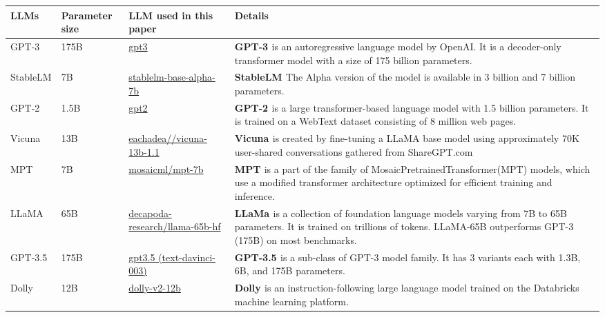 \begin{table}[!htp]\centering
\scriptsize
\begin{tabular}{p{1cm}|p{1.1cm}|p{3cm}|p{8.9cm}}\toprule
\textbf{LLMs} &\textbf{Parameter size} &\textbf{LLM used in this paper}  &\textbf{Details}\\\midrule
GPT-3 &175B & \href{https://platform.openai.com/docs/models/gpt-3}{gpt3} &  \textbf{GPT-3 \cite{brown2020language}} is an autoregressive language model by OpenAI. It is a decoder-only transformer model with a size of 175 billion parameters. \\ \midrule
StableLM &7B &\href{https://huggingface.co/stabilityai/stablelm-base-alpha-7b}{stablelm-base-alpha-7b} & \textbf{StableLM \cite{liu2023your}} The Alpha version of the model is available in 3 billion and 7 billion parameters.\\ \midrule
GPT-2 &1.5B &\href{https://huggingface.co/gpt2}{gpt2} & \textbf{GPT-2 \cite{radford2019language}} is a large transformer-based language model with 1.5 billion parameters. It is trained on a WebText dataset consisting of 8 million web pages. \\ \midrule
Vicuna &13B &\href{https://huggingface.co/eachadea/vicuna-13b-1.1}{eachadea//vicuna-13b-1.1} & \textbf{Vicuna \cite{vicuna2023}} is created by fine-tuning a LLaMA base model using approximately 70K user-shared conversations gathered from ShareGPT.com\\ \midrule
MPT &7B & \href{https://huggingface.co/mosaicml/mpt-7b}{mosaicml/mpt-7b} & \textbf{MPT \cite{wang2023multitask}} is a part of the family of MosaicPretrainedTransformer(MPT) models, which use a modified transformer architecture optimized for efficient training and inference.\\ \midrule
LLaMA &65B &\href{https://huggingface.co/decapoda-research/llama-65b-hf}{decapoda-research/llama-65b-hf} & \textbf{LLaMa \cite{touvron2023llama}} is a collection of foundation language models varying from 7B to 65B parameters. It is trained on trillions of tokens. LLaMA-65B outperforms GPT-3 (175B) on most benchmarks.\\  \midrule
GPT-3.5 &175B & \href{https://platform.openai.com/docs/models/gpt-3-5}{gpt3.5 (text-davinci-003)} &  \textbf{GPT-3.5 \cite{openaisafety}} is a sub-class of GPT-3 model family. It has 3 variants each with 1.3B, 6B, and 175B parameters.\\  \midrule
Dolly &12B &\href{https://huggingface.co/databricks/dolly-v2-12b}{dolly-v2-12b} & \textbf{Dolly \cite{dolly}} is an instruction-following large language model trained on the Databricks machine learning platform.\\  \midrule

\end{tabular}
\end{table}
